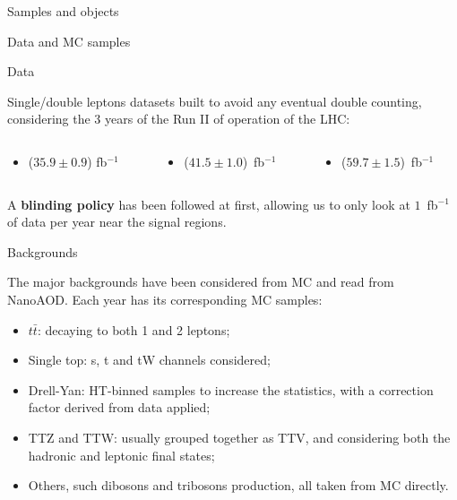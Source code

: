 \documentclass[8pt]{beamer}
\begin{document}
\begin{frame}[standout]
Samples and objects
\end{frame}

\begin{frame}{Data and MC samples}
\justifying
\begin{block}{\centering Data}\end{block}
\alert{Single/double leptons datasets} built to avoid any eventual double counting, considering the 3 years of the Run II of operation of the LHC:
\begin{columns}
\hspace{15pt}
	\begin{column}{0.32\textwidth}
		\begin{itemize}
		\item ($35.9 \pm 0.9$) fb$^{-1}$
		\end{itemize}
	\end{column} \hfill
	\begin{column}{0.32\textwidth}
		\begin{itemize}
		\item ($41.5 \pm 1.0$)~fb$^{-1}$
		\end{itemize}
	\end{column} \hfill
	\begin{column}{0.32\textwidth}
		\begin{itemize}
		\item ($59.7 \pm 1.5$)~fb$^{-1}$
		\end{itemize}
	\end{column} \hfill
\end{columns} \vfill
\vspace{5pt}
A \textbf{blinding policy} has been followed at first, allowing us to only look at $1$~fb$^{-1}$ of data per year near the signal regions. \vfill
\vspace{10pt}
\begin{block}{\centering Backgrounds}\end{block}
The \alert{major backgrounds have been considered from MC} and read from NanoAOD. Each year has its corresponding MC samples:

\begin{itemize}
\justifying
\item $t \bar t$: decaying to both 1 and 2 leptons;%
\item Single top: s, t and tW channels considered;
\item Drell-Yan: HT-binned samples to increase the statistics, with a correction factor derived from data applied;
\item TTZ and TTW: usually grouped together as TTV, and considering both the hadronic and leptonic final states;
\item Others, such dibosons and tribosons production, all taken from MC directly.
\end{itemize} \vfill
\end{frame}
\end{document}
